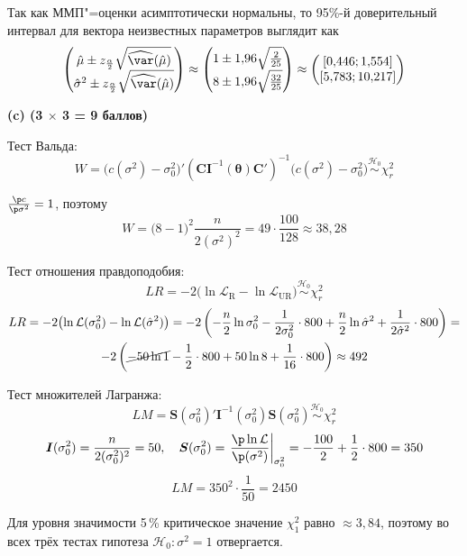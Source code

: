 \documentclass[pdftex,11pt,openany]{book}\usepackage[]{graphicx}\usepackage[]{color}
\newcommand{\calL}{\mathcal{L}}
\newcommand{\bs}[1]{\boldsymbol{#1}}
\newcommand{\hypo}{\mathcal{H}}
\newcommand{\simhypo}{\ensuremath{\mathrel{\stackrel{\hypo_0}{\sim}}}}
\begin{document}
\begin{solution}
Так как ММП"=оценки асимптотически нормальны, то 95\%-й доверительный интервал для вектора неизвестных параметров выглядит как
\[
\begin{pmatrix} \hat\mu \pm z_{\frac{\alpha}{2}} \sqrt{\widehat{\var}(\hat\mu)} \\ \hat\sigma^2 \pm z_{\frac{\alpha}{2}} \sqrt{\widehat{\var}(\hat\mu)} \end{pmatrix} \approx \begin{pmatrix} 1 \pm 1{,}96 \sqrt{\frac{2}{25}} \\ 8 \pm 1{,}96 \sqrt{\frac{32}{25}} \end{pmatrix} \approx \begin{pmatrix} [0{,}446; 1{,}554] \\ [5{,}783; 10{,}217] \end{pmatrix}
\]

\par\smallskip

\textbf{(c) (3 $\times$ 3 = 9 баллов)}

Тест Вальда:
\[
W = \bigl(c(\sigma^2) - \sigma^2_0 \bigr)' (\bs{C} \bs{I}^{-1}(\bs\theta) \bs{C}')^{-1} \bigl(c(\sigma^2) - \sigma^2_0 \bigr) \simhypo \chi^2_{r}
\]

$\frac{\p c}{\p \sigma^2}=1$, поэтому
\[
W = \bigl(8-1 \bigr)^2 \frac{n}{2(\sigma^2)^2} = 49\cdot \frac{100}{128} \approx 38{,}28
\]

Тест отношения правдоподобия:
\[
LR = -2 \bigl( \ln \calL_{\text{R}} - \ln \calL_{\text{UR}} \bigr) \simhypo \chi^2_r
\]
\begin{multline*}
LR =  -2 \bigl( \ln \calL(\sigma^2_0) - \ln \calL(\hat\sigma^2) \bigr)
 = -2 \left( -\frac{n}{2} \ln \sigma^2_0 - \frac{1}{2\sigma^2_0} \cdot 800 + \frac{n}{2} \ln \hat\sigma^2 + \frac{1}{2\hat\sigma^2} \cdot 800 \right) = \\
 -2 \left( \cancel{-50 \ln 1} - \frac{1}{2} \cdot 800 + 50 \ln 8 + \frac{1}{16} \cdot 800 \right) \approx 492
\end{multline*}

Тест множителей Лагранжа:
\[
LM = \bs{S}(\sigma^2_0)' \bs{I}^{-1}(\sigma^2_{0}) \bs{S}(\sigma^2_{0}) \simhypo \chi^2_r
\]
\[
\bs{I}(\sigma^2_0) = \frac{n}{2(\sigma^2_0)^2} = 50, \quad \bs{S}(\sigma^2_0) = \left. \frac{\p \ln \calL}{\p (\sigma^2)} \right|_{\sigma^2_0} = -\frac{100}{2} + \frac{1}{2} \cdot 800 = 350
\]
\[ LM = 350^2 \cdot \frac{1}{50} = 2450
\]

Для уровня значимости 5\,\% критическое значение $\chi^2_1$ равно $\approx3{,}84$, поэтому во всех трёх тестах гипотеза $\hypo_0\colon \sigma^2=1$ отвергается.


\end{solution}
\end{document}
